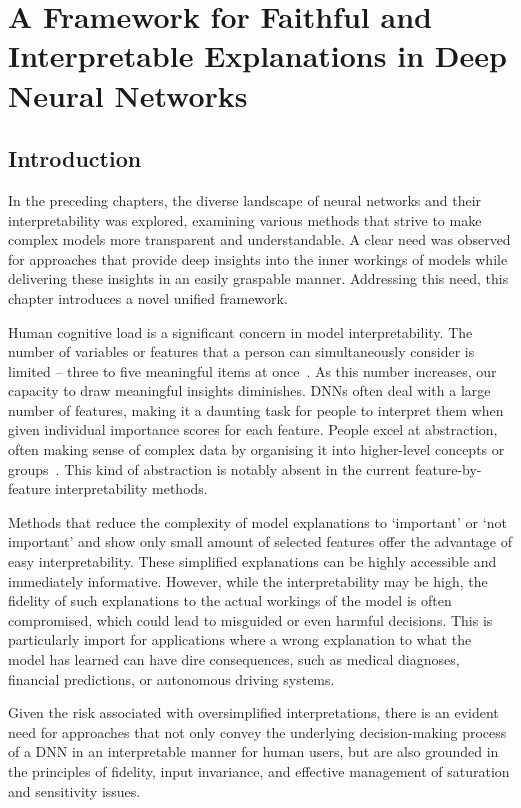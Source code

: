 \chapter{A Framework for Faithful and Interpretable Explanations in Deep Neural Networks}
\label{chap:framework}

\section{Introduction}

In the preceding chapters, the diverse landscape of neural networks and their interpretability was explored, examining various methods that strive to make complex models more transparent and understandable. A clear need was observed for approaches that provide deep insights into the inner workings of models while delivering these insights in an easily graspable manner. Addressing this need, this chapter introduces a novel unified framework.

Human cognitive load is a significant concern in model interpretability. The number of variables or features that a person can simultaneously consider is limited -- three to five meaningful items at once~\cite{cowan2001magical, starkey1995development, morris2018human}. As this number increases, our capacity to draw meaningful insights diminishes. DNNs often deal with a large number of features, making it a daunting task for people to interpret them when given individual importance scores for each feature. People excel at abstraction, often making sense of complex data by organising it into higher-level concepts or groups~\cite{JANVRIN201431, olsen2023social}. This kind of abstraction is notably absent in the current feature-by-feature interpretability methods. 

Methods that reduce the complexity of model explanations to `important' or `not important' and show only small amount of selected features offer the advantage of easy interpretability. These simplified explanations can be highly accessible and immediately informative. However, while the interpretability may be high, the fidelity of such explanations to the actual workings of the model is often compromised, which could lead to misguided or even harmful decisions. This is particularly import for applications where a wrong explanation to what the model has learned can have dire consequences, such as medical diagnoses, financial predictions, or autonomous driving systems.

Given the risk associated with oversimplified interpretations, there is an evident need for approaches that not only convey the underlying decision-making process of a DNN in an interpretable manner for human users, but are also grounded in the principles of fidelity, input invariance, and effective management of saturation and sensitivity issues. 

